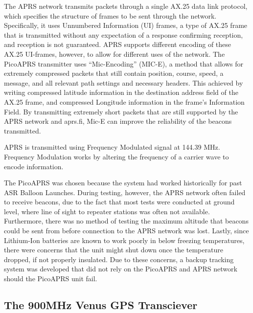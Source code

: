 \documentclass[12pt,]{article}
\begin{document}
The APRS network transmits packets through a single AX.25 data link
protocol, which specifies the structure of frames to be sent through the
network. Specifically, it uses Unnumbered Information (UI) frames, a
type of AX.25 frame that is transmitted without any expectation of a
response confirming reception, and reception is not guaranteed. APRS
supports different encoding of these AX.25 UI-frames, however, to allow
for different uses of the network. The PicoAPRS transmitter uses
``Mic-Encoding'' (MIC-E), a method that allows for extremely compressed
packets that still contain position, course, speed, a message, and all
relevant path settings and necessary headers. This achieved by writing
compressed latitude information in the destination address field of the
AX.25 frame, and compressed Longitude information in the frame's
Information Field. By transmitting extremely short packets that are
still supported by the APRS network and aprs.fi, Mic-E can improve the
reliability of the beacons transmitted.

APRS is transmitted using Frequency Modulated signal at 144.39 MHz.
Frequency Modulation works by altering the frequency of a carrier wave
to encode information.

The PicoAPRS was chosen because the system had worked historically for
past ASR Balloon Launches. During testing, however, the APRS network
often failed to receive beacons, due to the fact that most tests were
conducted at ground level, where line of sight to repeater stations was
often not available. Furthermore, there was no method of testing the
maximum altitude that beacons could be sent from before connection to
the APRS network was lost. Lastly, since Lithium-Ion batteries are known
to work poorly in below freezing temperatures, there were concerns that
the unit might shut down once the temperature dropped, if not properly
insulated. Due to these concerns, a backup tracking system was developed
that did not rely on the PicoAPRS and APRS network should the PicoAPRS
unit fail.

\subsection{The 900MHz Venus GPS
Transciever}\label{the-900mhz-venus-gps-transciever}
\end{document}
